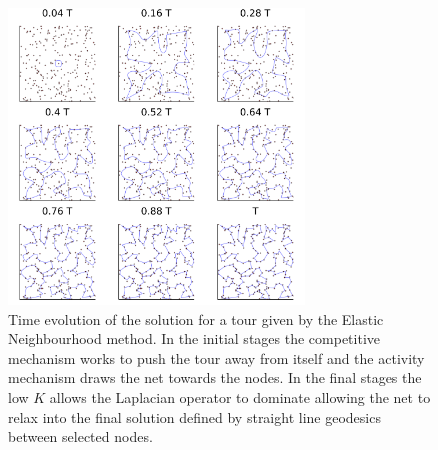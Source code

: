 \begin{figure}[h]
	\centering
	\includegraphics[width=0.7\textwidth]{images/elastic_neighbourhood/fig_elastic_neighbourhood_time_series}
	\def\c{Time evolution of the solution for a tour given by the Elastic Neighbourhood method. }
	\caption[\c]{\label{fig:elastic_nighbourhood_time_series} \c In the initial stages the competitive mechanism works to push the tour away from itself and the activity mechanism draws the net towards the nodes. In the final stages the low $K$ allows the Laplacian operator to dominate allowing the net to relax into the final solution defined by straight line geodesics between selected nodes.}
\end{figure}

